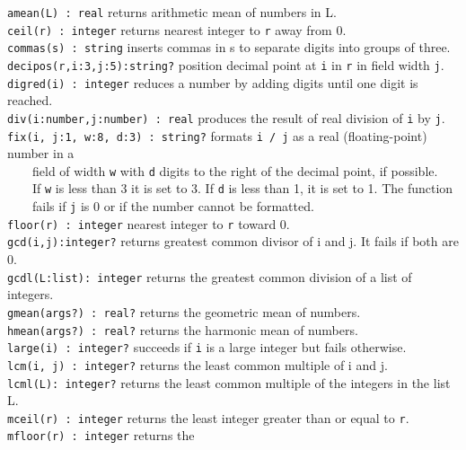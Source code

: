 \texttt{amean(L) : real} returns arithmetic mean of
numbers in L.\\
\texttt{ceil(r) : integer} returns nearest integer to
\texttt{r} away from 0.\\
\texttt{commas(s) : string} inserts commas in s to separate digits into
groups of three.\\
\texttt{decipos(r,i:3,j:5):string?} position decimal point at \texttt{i}
in \texttt{r} in field width \texttt{j}.\\
\texttt{digred(i) : integer} reduces a number by adding digits until one
digit is reached.\\
\texttt{div(i:number,j:number) : real} produces the result of real
division of \texttt{i} by \texttt{j}.\\
\texttt{fix(i, j:1, w:8, d:3) : string?} formats \texttt{i / j} as a
real (floating-point) number in a\\
 \ \ \ \ field of width \texttt{w} with \texttt{d} digits to
the right of the decimal point, if possible.\\
 \ \ \ \ If \texttt{w} is less than 3 it is set to 3. If \texttt{d} is
less than 1, it is set to 1. The function\\
 \ \ \ \  fails if \texttt{j}
is 0 or if the number cannot be formatted.\\
\texttt{floor(r)}\texttt{ : integer} nearest integer to
\texttt{r} toward 0.\\
\texttt{gcd(i,j):integer?} returns greatest common divisor of i and j.
It fails if both are 0.\\
\texttt{gcdl(L:list): integer} returns the greatest common division of a
list of integers.\\
\texttt{gmean(args?) : real?} returns the geometric mean of
numbers.\\
\texttt{hmean(args?) : real?} returns the harmonic mean of
numbers.\\
\texttt{large(i) : integer?} succeeds if \texttt{i} is a large integer
but fails otherwise.\\
\texttt{lcm(i, j) : integer?} returns the least common multiple of i and
j.\\
\texttt{lcml(L): integer?} returns the least common multiple of the
integers in the list L.\\
\texttt{mceil(r) : integer} returns the least integer
greater than or equal to \texttt{r}.\\
\texttt{mfloor(r)}\texttt{ : integer} returns the
